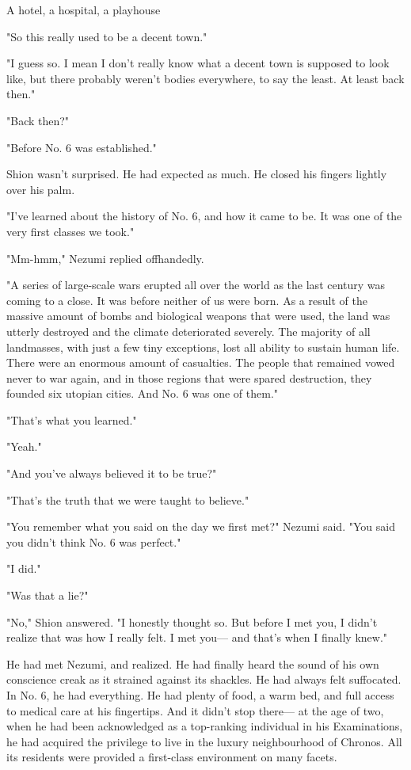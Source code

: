 A hotel, a hospital, a playhouse\el 

"So this really used to be a decent town."

"I guess so. I mean I don't really know what a decent town is supposed
to look like, but there probably weren't bodies everywhere, to say the
least. At least back then."

"Back then?"

"Before No. 6 was established."

Shion wasn't surprised. He had expected as much. He closed his fingers
lightly over his palm.

"I've learned about the history of No. 6, and how it came to be. It was
one of the very first classes we took."

"Mm-hmm," Nezumi replied offhandedly.

"A series of large-scale wars erupted all over the world as the last
century was coming to a close. It was before neither of us were born. As
a result of the massive amount of bombs and biological weapons that were
used, the land was utterly destroyed and the climate deteriorated
severely. The majority of all landmasses, with just a few tiny
exceptions, lost all ability to sustain human life. There were an
enormous amount of casualties. The people that remained vowed never to
war again, and in those regions that were spared destruction, they
founded six utopian cities. And No. 6 was one of them."

"That's what you learned."

"Yeah."

"And you've always believed it to be true?"

"That's the truth that we were taught to believe."

"You remember what you said on the day we first met?" Nezumi said. "You
said you didn't think No. 6 was perfect."

"I did."

"Was that a lie?"

"No," Shion answered. "I honestly thought so. But before I met you, I
didn't realize that was how I really felt. I met you--- and that's when I
finally knew."

He had met Nezumi, and realized. He had finally heard the sound of his
own conscience creak as it strained against its shackles. He had always
felt suffocated. In No. 6, he had everything. He had plenty of food, a
warm bed, and full access to medical care at his fingertips. And it
didn't stop there--- at the age of two, when he had been acknowledged as a
top-ranking individual in his Examinations, he had acquired the
privilege to live in the luxury neighbourhood of Chronos. All its
residents were provided a first-class environment on many facets.

